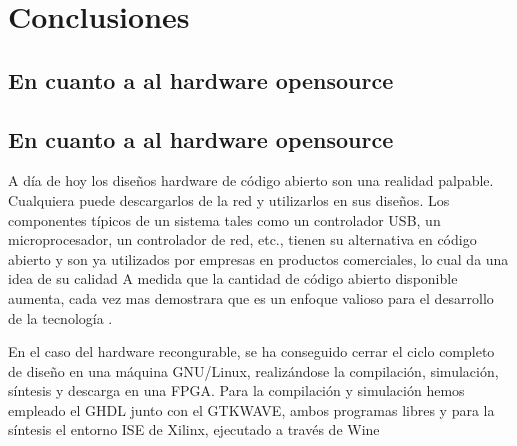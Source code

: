 \chapter{Conclusiones}

	\section{En cuanto a al hardware opensource}
	 

	\section{En cuanto a al hardware opensource} 
A día de hoy los diseños hardware de código abierto son una realidad palpable. Cualquiera puede descargarlos de la red y utilizarlos en sus diseños. Los componentes típicos de un sistema tales como un controlador USB, un microprocesador, un controlador de red, etc., tienen su alternativa en código abierto y son ya utilizados por empresas en productos comerciales, lo cual da una idea de su calidad
A medida que la cantidad de código abierto disponible aumenta, cada vez mas demostrara que es un enfoque valioso para el desarrollo de la tecnología .

En el caso del hardware recongurable, se ha conseguido cerrar el ciclo completo de diseño en una máquina GNU/Linux, realizándose la compilación, simulación, síntesis y descarga en una FPGA. Para la compilación y simulación hemos empleado el GHDL junto con el GTKWAVE, ambos programas libres y para la síntesis el entorno ISE de Xilinx, ejecutado a través de Wine

